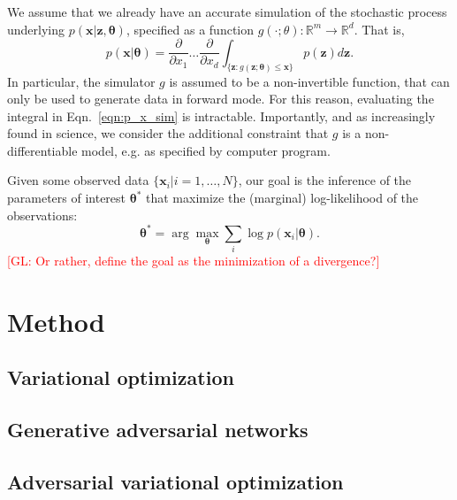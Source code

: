 \documentclass[twocolumn,superscriptaddress,aps]{revtex4-1}
\newcommand{\glnote}[1]{\textcolor{red}{[GL: #1]}}
\theoremstyle{plain}
\begin{document}
We assume that we already have an accurate simulation of the stochastic process
underlying $p(\mathbf{x}|\mathbf{z},\mathbf{\theta})$, specified as a function $g(\cdot;
\theta) : \mathbb{R}^m \to \mathbb{R}^d$. That is,
\begin{equation}\label{eqn:p_x_sim}
    p(\mathbf{x}|\mathbf{\theta}) = \frac{\partial}{\partial x_1} \dots \frac{\partial}{\partial x_d} \int_{\{\mathbf{z}:g(\mathbf{z};\mathbf{\theta}) \leq \mathbf{x}\}} p(\mathbf{z}) d\mathbf{z}.
\end{equation}
In particular, the simulator $g$ is assumed to be a non-invertible function, that can
only be used to generate data in forward mode.
For this reason, evaluating the integral in Eqn.~\ref{eqn:p_x_sim} is intractable.
Importantly, and as increasingly found in science, we consider the additional constraint that $g$ is a non-differentiable
model, e.g. as specified by computer program.

Given some observed data $\{ \mathbf{x}_i | i=1, \dots, N \}$, our goal is the inference
of the parameters of interest $\mathbf{\theta}^*$ that maximize the (marginal) log-likelihood of the observations:
\begin{equation}
    \mathbf{\theta}^* = \arg \max_\mathbf{\theta} \sum_i \log p(\mathbf{x}_i | \mathbf{\theta}).
\end{equation}
\glnote{Or rather, define the goal as the minimization of a divergence?}



\section{Method}

\subsection{Variational optimization}

\subsection{Generative adversarial networks}

\subsection{Adversarial variational optimization}


\end{document}
